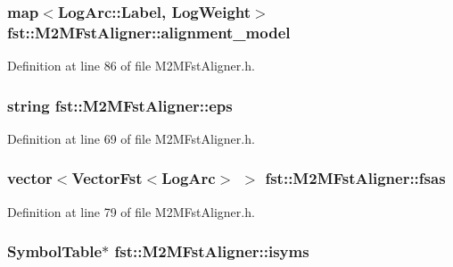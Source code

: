 \subsubsection[{alignment\+\_\+model}]{\setlength{\rightskip}{0pt plus 5cm}map$<$Log\+Arc\+::\+Label, Log\+Weight$>$ fst\+::\+M2\+M\+Fst\+Aligner\+::alignment\+\_\+model}\hypertarget{classfst_1_1_m2_m_fst_aligner_a28eef199b821dbf9a30c4e5e0c2f91f5}{}\label{classfst_1_1_m2_m_fst_aligner_a28eef199b821dbf9a30c4e5e0c2f91f5}


Definition at line 86 of file M2\+M\+Fst\+Aligner.\+h.

\subsubsection[{eps}]{\setlength{\rightskip}{0pt plus 5cm}string fst\+::\+M2\+M\+Fst\+Aligner\+::eps}\hypertarget{classfst_1_1_m2_m_fst_aligner_accef9f2dfd2f0c5a91ccf7c796d832cf}{}\label{classfst_1_1_m2_m_fst_aligner_accef9f2dfd2f0c5a91ccf7c796d832cf}


Definition at line 69 of file M2\+M\+Fst\+Aligner.\+h.

\subsubsection[{fsas}]{\setlength{\rightskip}{0pt plus 5cm}vector$<$Vector\+Fst$<$Log\+Arc$>$ $>$ fst\+::\+M2\+M\+Fst\+Aligner\+::fsas}\hypertarget{classfst_1_1_m2_m_fst_aligner_adfa1cb33010886b0f58955d4ad5572cd}{}\label{classfst_1_1_m2_m_fst_aligner_adfa1cb33010886b0f58955d4ad5572cd}


Definition at line 79 of file M2\+M\+Fst\+Aligner.\+h.

\subsubsection[{isyms}]{\setlength{\rightskip}{0pt plus 5cm}Symbol\+Table$\ast$ fst\+::\+M2\+M\+Fst\+Aligner\+::isyms}\hypertarget{classfst_1_1_m2_m_fst_aligner_a9a259b679800a82cca3822f6abaa0e60}{}\label{classfst_1_1_m2_m_fst_aligner_a9a259b679800a82cca3822f6abaa0e60}


